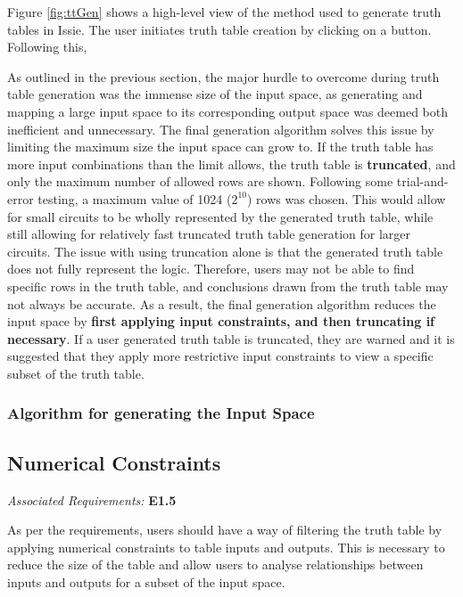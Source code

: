 Figure \ref{fig:ttGen} shows a high-level view of the method used to generate truth tables in Issie. The user initiates truth table creation by clicking on a button. Following this, 

As outlined in the previous section, the major hurdle to overcome during truth table generation was the immense size of the input space, as generating and mapping a large input space to its corresponding output space was deemed both inefficient and unnecessary. The final generation algorithm solves this issue by limiting the maximum size the input space can grow to. If the truth table has more input combinations than the limit allows, the truth table is \textbf{truncated}, and only the maximum number of allowed rows are shown. Following some trial-and-error testing, a maximum value of 1024 ($2^10$) rows was chosen. This would allow for small circuits to be wholly represented by the generated truth table, while still allowing for relatively fast truncated truth table generation for larger circuits. The issue with using truncation alone is that the generated truth table does not fully represent the logic. Therefore, users may not be able to find specific rows in the truth table, and conclusions drawn from the truth table may not always be accurate. As a result, the final generation algorithm reduces the input space by \textbf{first applying input constraints, and then truncating if necessary}. If a user generated truth table is truncated, they are warned and it is suggested that they apply more restrictive input constraints to view a specific subset of the truth table.



\subsubsection{Algorithm for generating the Input Space}


\subsection{Numerical Constraints}
\emph{Associated Requirements:} \textbf{E1.5}

As per the requirements, users should have a way of filtering the truth table by applying numerical constraints to table inputs and outputs. This is necessary to reduce the size of the table and allow users to analyse relationships between inputs and outputs for a subset of the input space. 



